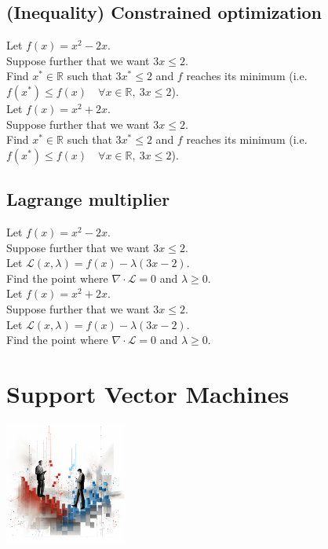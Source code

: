 \documentclass[]{article}
\newcommand{\R}{\mathbb{R}}
\begin{document}
	\subsection{(Inequality) Constrained optimization}
	Let $f(x) = x^2-2x$.\\
	Suppose further that we want $3x \leq 2$.\\
	Find $x^* \in \R$ such that $3x^* \leq 2$ and $f$ reaches its minimum (i.e. $f(x^*) \leq f(x) \quad \forall x \in \R,\ 3x \leq 2$).
	\vspace{0.5cm}
	\\
	Let $f(x) = x^2+2x$.\\
	Suppose further that we want $3x \leq 2$.\\
	Find $x^* \in \R$ such that $3x^* \leq 2$ and $f$ reaches its minimum (i.e. $f(x^*) \leq f(x) \quad \forall x \in \R,\ 3x \leq 2$).
	
	\subsection{Lagrange multiplier}
	Let $f(x) = x^2-2x$.\\
	Suppose further that we want $3x \leq 2$.\\
	Let $\mathcal{L}(x,\lambda) = f(x) - \lambda (3x - 2)$.\\
	Find the point where $\nabla \cdot \mathcal{L} = 0$ and $\lambda \geq 0$.
	\vspace{0.5cm}
	\\
	Let $f(x) = x^2+2x$.\\
	Suppose further that we want $3x \leq 2$.\\
	Let $\mathcal{L}(x,\lambda) = f(x) - \lambda (3x - 2)$.\\
	Find the point where $\nabla \cdot \mathcal{L} = 0$ and $\lambda \geq 0$.
	
	
	
	
	
	\section{Support Vector Machines}
	\begin{center}
		\includegraphics[height=4cm]{SVM_illustration}
	\end{center}
	
\end{document}
